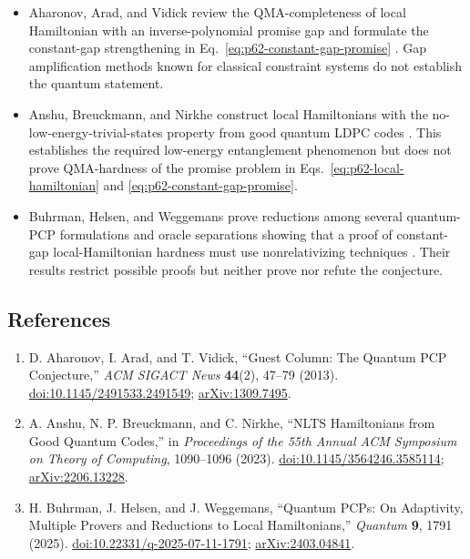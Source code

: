 \begin{itemize}
  \item Aharonov, Arad, and Vidick review the QMA-completeness of local
  Hamiltonian with an inverse-polynomial promise gap and formulate the
  constant-gap strengthening in
  Eq.~\eqref{eq:p62-constant-gap-promise}
  .  Gap amplification methods known for
  classical constraint systems do not establish the quantum statement.

  \item Anshu, Breuckmann, and Nirkhe construct local Hamiltonians with the
  no-low-energy-trivial-states property from good quantum LDPC codes
  .  This establishes the required
  low-energy entanglement phenomenon but does not prove QMA-hardness of the
  promise problem in Eqs.~\eqref{eq:p62-local-hamiltonian} and
  \eqref{eq:p62-constant-gap-promise}.

  \item Buhrman, Helsen, and Weggemans prove reductions among several
  quantum-PCP formulations and oracle separations showing that a proof of
  constant-gap local-Hamiltonian hardness must use nonrelativizing
  techniques .  Their results restrict
  possible proofs but neither prove nor refute the conjecture.
\end{itemize}

\subsection*{References}

\begin{enumerate}[label={},leftmargin=4.8em,labelsep=0.5em]
  \footnotesize
  \item[\textup{[AAV13]}]\label{ref:p62-aharonov}
  D. Aharonov, I. Arad, and T. Vidick,
  ``Guest Column: The Quantum PCP Conjecture,''
  \emph{ACM SIGACT News} \textbf{44}(2), 47--79 (2013).
  \href{https://doi.org/10.1145/2491533.2491549}%
       {doi:10.1145/2491533.2491549};
  \href{https://arxiv.org/abs/1309.7495}{arXiv:1309.7495}.

  \item[\textup{[ABN23]}]\label{ref:p62-anshu}
  A. Anshu, N. P. Breuckmann, and C. Nirkhe,
  ``NLTS Hamiltonians from Good Quantum Codes,'' in
  \emph{Proceedings of the 55th Annual ACM Symposium on Theory of Computing},
  1090--1096 (2023).
  \href{https://doi.org/10.1145/3564246.3585114}%
       {doi:10.1145/3564246.3585114};
  \href{https://arxiv.org/abs/2206.13228}{arXiv:2206.13228}.

  \item[\textup{[BHW25]}]\label{ref:p62-buhrman}
  H. Buhrman, J. Helsen, and J. Weggemans,
  ``Quantum PCPs: On Adaptivity, Multiple Provers and Reductions to Local
  Hamiltonians,'' \emph{Quantum} \textbf{9}, 1791 (2025).
  \href{https://doi.org/10.22331/q-2025-07-11-1791}%
       {doi:10.22331/q-2025-07-11-1791};
  \href{https://arxiv.org/abs/2403.04841}{arXiv:2403.04841}.
\end{enumerate}

